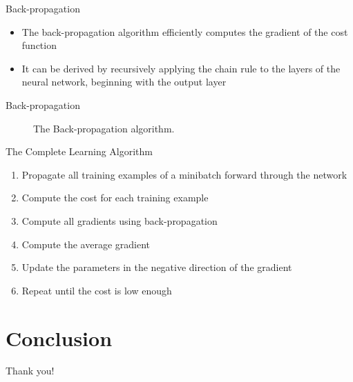\documentclass{beamer}
\begin{document}
	\begin{frame}{Back-propagation}
		\begin{itemize}
			\item <1-> The back-propagation algorithm efficiently computes the gradient of the cost function
			\item <2-> It can be derived by recursively applying the chain rule to the layers of the neural network, beginning with the output layer
		\end{itemize}
	\end{frame}
	\begin{frame}{Back-propagation}
		\begin{figure}
			\begin{center}
				
			\end{center}
			\caption{The Back-propagation algorithm.}
		\end{figure}
	\end{frame}
	\begin{frame}{The Complete Learning Algorithm}
		\begin{enumerate}
			\item <1-> Propagate all training examples of a minibatch forward through the network
			\item <2-> Compute the cost for each training example
			\item <3-> Compute all gradients using back-propagation
			\item <4-> Compute the average gradient
			\item <5-> Update the parameters in the negative direction of the gradient
			\item <6-> Repeat until the cost is low enough
		\end{enumerate}
	\end{frame}
	
	\section{Conclusion}
	\begin{frame}[standout]
		Thank you!
	\end{frame}
	
\end{document}
